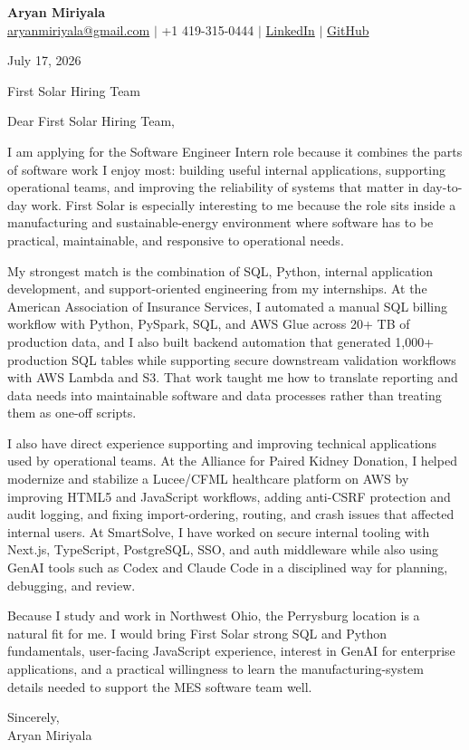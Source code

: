 \documentclass[letterpaper,11pt]{article}
\begin{document}
{\Large\textbf{Aryan Miriyala}}\\
\href{mailto:aryanmiriyala@gmail.com}{aryanmiriyala@gmail.com} $|$ +1 419-315-0444 $|$
\href{https://www.linkedin.com/in/aryan-miriyala-7788a21b6/}{LinkedIn} $|$
\href{https://github.com/aryanmiriyala}{GitHub}

July 17, 2026

First Solar Hiring Team

Dear First Solar Hiring Team,

I am applying for the Software Engineer Intern role because it combines the parts of software work I enjoy most: building useful internal applications, supporting operational teams, and improving the reliability of systems that matter in day-to-day work. First Solar is especially interesting to me because the role sits inside a manufacturing and sustainable-energy environment where software has to be practical, maintainable, and responsive to operational needs.

My strongest match is the combination of SQL, Python, internal application development, and support-oriented engineering from my internships. At the American Association of Insurance Services, I automated a manual SQL billing workflow with Python, PySpark, SQL, and AWS Glue across 20+ TB of production data, and I also built backend automation that generated 1,000+ production SQL tables while supporting secure downstream validation workflows with AWS Lambda and S3. That work taught me how to translate reporting and data needs into maintainable software and data processes rather than treating them as one-off scripts.

I also have direct experience supporting and improving technical applications used by operational teams. At the Alliance for Paired Kidney Donation, I helped modernize and stabilize a Lucee/CFML healthcare platform on AWS by improving HTML5 and JavaScript workflows, adding anti-CSRF protection and audit logging, and fixing import-ordering, routing, and crash issues that affected internal users. At SmartSolve, I have worked on secure internal tooling with Next.js, TypeScript, PostgreSQL, SSO, and auth middleware while also using GenAI tools such as Codex and Claude Code in a disciplined way for planning, debugging, and review.

Because I study and work in Northwest Ohio, the Perrysburg location is a natural fit for me. I would bring First Solar strong SQL and Python fundamentals, user-facing JavaScript experience, interest in GenAI for enterprise applications, and a practical willingness to learn the manufacturing-system details needed to support the MES software team well.

Sincerely,\\
Aryan Miriyala
\end{document}
